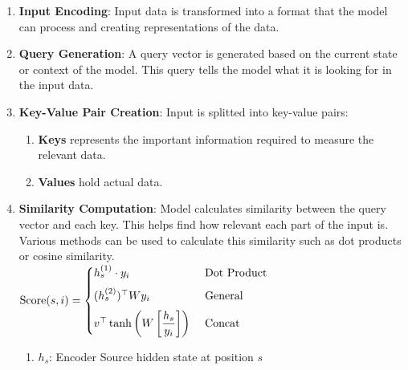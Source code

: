 \begin{enumerate}
    \item \textbf{Input Encoding}: Input data is transformed into a format that the model can process and creating representations of the data.
    \hfill \cite{geeksforgeeks/artificial-intelligence/ml-attention-mechanism/}

    \item \textbf{Query Generation}: A query vector is generated based on the current state or context of the model. 
    This query tells the model what it is looking for in the input data.
    \hfill \cite{geeksforgeeks/artificial-intelligence/ml-attention-mechanism/}

    \item \textbf{Key-Value Pair Creation}: Input is splitted into key-value pairs:
    \hfill \cite{geeksforgeeks/artificial-intelligence/ml-attention-mechanism/}
    \begin{enumerate}
        \item \textbf{Keys} represents the important information required to measure the relevant data.
        \hfill \cite{geeksforgeeks/artificial-intelligence/ml-attention-mechanism/}
        
        \item \textbf{Values} hold actual data.
        \hfill \cite{geeksforgeeks/artificial-intelligence/ml-attention-mechanism/}
    \end{enumerate}

    \item \textbf{Similarity Computation}: Model calculates similarity between the query vector and each key. This helps find how relevant each part of the input is. 
    Various methods can be used to calculate this similarity such as dot products or cosine similarity.
    \hfill \cite{geeksforgeeks/artificial-intelligence/ml-attention-mechanism/}
    \\[0.2cm]
    $
        \text{Score}(s,i) = 
        \begin{cases}
            h_s^{(1)}\cdot y_i & \text{ Dot Product} \\[0.2cm]
            (h_s^{(2)})^\top Wy_i & \text{ General} \\[0.2cm]
            v^\top \tanh\left(W\left[\dfrac{h_s}{y_i}\right]\right) & \text{ Concat}
        \end{cases}
    $
    \hfill \cite{geeksforgeeks/artificial-intelligence/ml-attention-mechanism/}
    \\[0.2cm]
    \begin{enumerate}
        \item $h_s$: Encoder Source hidden state at position $s$
        \hfill \cite{geeksforgeeks/artificial-intelligence/ml-attention-mechanism/}


\end{enumerate}
\end{enumerate}
